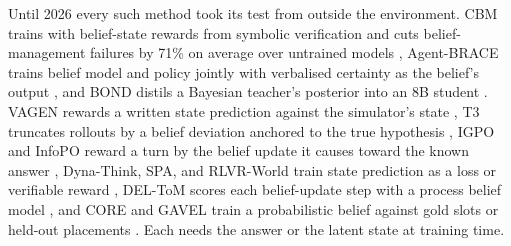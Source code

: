 Until 2026 every such method took its test from outside the environment. CBM trains with belief-state rewards from symbolic verification and cuts belief-management failures by 71\% on average over untrained models \citep{xu2026should}, Agent-BRACE trains belief model and policy jointly with verbalised certainty as the belief's output \citep{singh2026agent}, and BOND distils a Bayesian teacher's posterior into an 8B student \citep{cui2026distilling}. VAGEN rewards a written state prediction against the simulator's state \citep{wang2025vagen}, T3 truncates rollouts by a belief deviation anchored to the true hypothesis \citep{zou2025t3}, IGPO and InfoPO reward a turn by the belief update it causes toward the known answer \citep{wang2025information,kong2026infopo}, Dyna-Think, SPA, and RLVR-World train state prediction as a loss or verifiable reward \citep{yu2025dynathink,chen2025why,wu2025rlvrworld}, DEL-ToM scores each belief-update step with a process belief model \citep{wu2025deltom}, and CORE and GAVEL train a probabilistic belief against gold slots or held-out placements \citep{zhang2026toward,wang2026gavel}. Each needs the answer or the latent state at training time.
